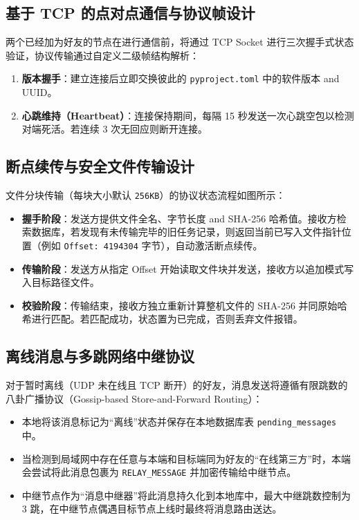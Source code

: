 \documentclass[UTF8]{ctexart}
\begin{document}
\subsection{基于 TCP 的点对点通信与协议帧设计}
两个已经加为好友的节点在进行通信前，将通过 TCP Socket 进行三次握手式状态验证，协议传输通过自定义二级帧结构解析：
\begin{enumerate}
    \item \textbf{版本握手}：建立连接后立即交换彼此的 \texttt{pyproject.toml} 中的软件版本 and UUID。
    \item \textbf{心跳维持（Heartbeat）}：连接保持期间，每隔 15 秒发送一次心跳空包以检测对端死活。若连续 3 次无回应则断开连接。
\end{enumerate}

\subsection{断点续传与安全文件传输设计}
文件分块传输（每块大小默认 \texttt{256KB}）的协议状态流程如图所示：
\begin{itemize}
    \item \textbf{握手阶段}：发送方提供文件全名、字节长度 and SHA-256 哈希值。接收方检索数据库，若发现有未传输完毕的旧任务记录，则返回当前已写入文件指针位置（例如 \texttt{Offset: 4194304} 字节），自动激活断点续传。
    \item \textbf{传输阶段}：发送方从指定 Offset 开始读取文件块并发送，接收方以追加模式写入目标路径文件。
    \item \textbf{校验阶段}：传输结束，接收方独立重新计算整机文件的 SHA-256 并同原始哈希进行匹配。若匹配成功，状态置为已完成，否则丢弃文件报错。
\end{itemize}

\subsection{离线消息与多跳网络中继协议}
对于暂时离线（UDP 未在线且 TCP 断开）的好友，消息发送将遵循有限跳数的八卦广播协议（Gossip-based Store-and-Forward Routing）：
\begin{itemize}
    \item 本地将该消息标记为“离线”状态并保存在本地数据库表 \texttt{pending\_messages} 中。
    \item 当检测到局域网中存在任意与本端和目标端同为好友的“在线第三方”时，本端会尝试将此消息包裹为 \texttt{RELAY\_MESSAGE} 并加密传输给中继节点。
    \item 中继节点作为“消息中继器”将此消息持久化到本地库中，最大中继跳数控制为 3 跳，在中继节点偶遇目标节点上线时最终将消息路由送达。
\end{itemize}
\end{document}
